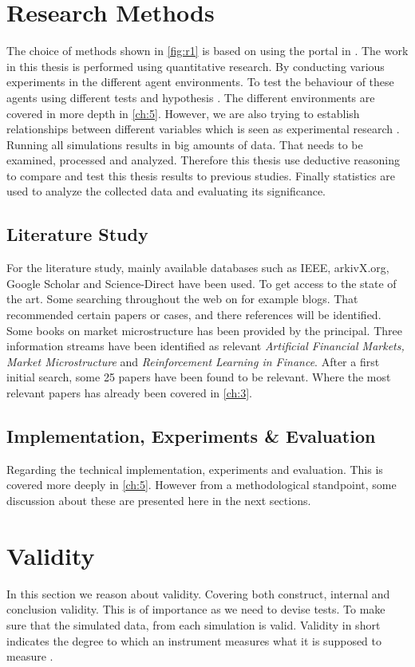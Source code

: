 \documentclass{kththesis}
\theoremstyle{definition}
\begin{document}
\section{Research Methods}
The choice of methods shown in \autoref{fig:r1} is based on using the portal in \parencite{haakansson2013portal}. The work in this thesis is performed using quantitative research. By conducting various experiments in the different agent environments. To test the behaviour of these agents using different tests and hypothesis \parencite{haakansson2013portal}. The different environments are covered in more depth in \autoref{ch:5}. However, we are also trying to establish relationships between different variables which is seen as experimental research \parencite{haakansson2013portal}.  Running all simulations results in big amounts of data. That needs to be examined, processed and analyzed. Therefore this thesis use deductive reasoning to compare and test this thesis results to previous studies. Finally statistics are used to analyze the collected data and evaluating its significance.

\subsection{Literature Study}
For the literature study, mainly available databases such as IEEE, arkivX.org, Google Scholar and Science-Direct have been used. To get access to the state of the art. Some searching throughout the web on for example blogs. That recommended certain papers or cases, and there references will be identified. Some books on market microstructure has been provided by the principal. Three information streams have been identified as relevant \textit{Artificial Financial Markets, Market Microstructure} and \textit{Reinforcement Learning in Finance}. After a first initial search, some 25 papers have been found to be relevant. Where the most relevant papers has already been covered in \autoref{ch:3}.

\subsection{Implementation, Experiments \& Evaluation}
Regarding the technical implementation, experiments and evaluation. This is covered more deeply in \autoref{ch:5}. However from a methodological standpoint, some discussion about these are presented here in the next sections.

\section{Validity}
In this section we reason about validity. Covering both construct, internal and conclusion validity. This is of importance as we need to devise tests. To make sure that the simulated data, from each simulation is valid. Validity in short indicates the degree to which an instrument measures what it is supposed to measure \parencite{kothari2004research}.
\end{document}
